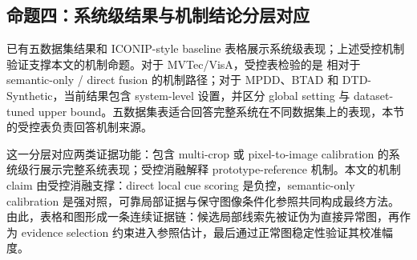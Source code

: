 \subsection{命题四：系统级结果与机制结论分层对应}

已有五数据集结果和 ICONIP-style baseline 表格展示系统级表现；上述受控机制验证支撑本文的机制命题。对于 MVTec/VisA，受控表检验的是 \method{} 相对于 semantic-only / direct fusion 的机制路径；对于 MPDD、BTAD 和 DTD-Synthetic，当前结果包含 system-level 设置，并区分 global setting 与 dataset-tuned upper bound。五数据集表适合回答完整系统在不同数据集上的表现，本节的受控表负责回答机制来源。

这一分层对应两类证据功能：包含 multi-crop 或 pixel-to-image calibration 的系统级行展示完整系统表现；受控消融解释 prototype-reference 机制。本文的机制 claim 由受控消融支撑：direct local cue scoring 是负控，semantic-only calibration 是强对照，可靠局部证据与保守图像条件化参照共同构成最终方法。由此，表格和图形成一条连续证据链：候选局部线索先被证伪为直接异常图，再作为 evidence selection 约束进入参照估计，最后通过正常图稳定性验证其校准幅度。
